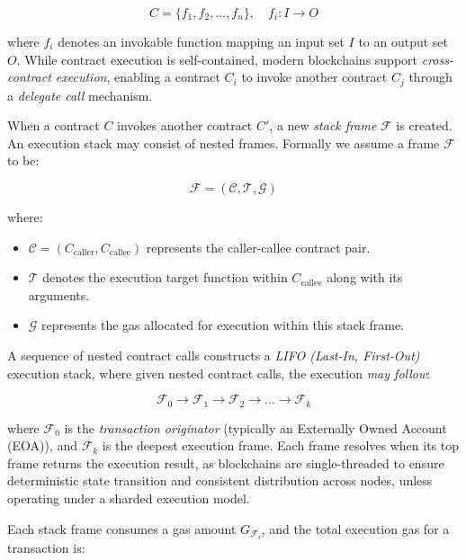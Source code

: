 \documentclass{article}
\begin{document}
\begin{equation}
C = \{ f_1, f_2, \dots, f_n \}, \quad f_i: I \to O
\end{equation}

where \( f_i \) denotes an invokable function mapping an input set \( I \) to an output set \( O \). While contract execution is self-contained, modern blockchains support \textit{cross-contract execution}, enabling a contract \( C_i \) to invoke another contract \( C_j \) through a \textit{delegate call} mechanism.  

When a contract \( C \) invokes another contract \( C' \), a new \textit{stack frame} \( \mathcal{F} \) is created. An execution stack may consist of nested frames. Formally we assume a frame $\mathcal{F}$ to be:

\begin{equation}
\mathcal{F} = (\mathcal{C}, \mathcal{T}, \mathcal{G})
\end{equation}

where:
\begin{itemize}
    \item \( \mathcal{C} = (C_{\text{caller}}, C_{\text{callee}}) \) represents the caller-callee contract pair.
    \item \( \mathcal{T} \) denotes the execution target function within \( C_{\text{callee}} \) along with its arguments.
    \item \( \mathcal{G} \) represents the gas allocated for execution within this stack frame.
\end{itemize}

A sequence of nested contract calls constructs a \textit{LIFO (Last-In, First-Out)} execution stack, where given nested contract calls, the execution \textit{may follow}:

\begin{equation}
\mathcal{F}_0 \to \mathcal{F}_1 \to \mathcal{F}_2 \to \dots \to \mathcal{F}_k
\end{equation}
    
where \( \mathcal{F}_0 \) is the \textit{transaction originator} (typically an Externally Owned Account (EOA)), and \( \mathcal{F}_k \) is the deepest execution frame. Each frame resolves when its top frame returns the execution result, as blockchains are single-threaded to ensure deterministic state transition and consistent distribution across nodes, unless operating under a sharded execution model.
    
Each stack frame consumes a gas amount \( G_{\mathcal{F}_i} \), and the total execution gas for a transaction is:
\end{document}
